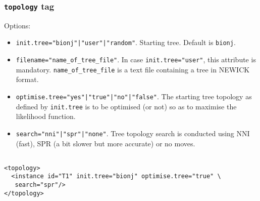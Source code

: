 \documentclass[a4paper,12pt]{article}
\newcommand{\x}[1]{\texttt{#1}}
\begin{document}
\subsubsection{{\tt topology} tag}
Options:
\begin{itemize}
\item \x{init.tree="bionj"|"user"|"random"}.  Starting tree. Default is \x{bionj}.
\item \x{filename="name\_of\_tree\_file"}. In case \x{init.tree="user"}, this
  attribute  is mandatory. \x{name\_of\_tree\_file} is a
  text file containing a tree in NEWICK format. 
\item \x{optimise.tree="yes"|"true"|"no"|"false"}. The starting tree topology as defined by
  \x{init.tree} is to be optimised (or not) so as to maximise the likelihood function.
\item \x{search="nni"|"spr"|"none"}. Tree topology search is conducted using NNI (fast), SPR (a bit
  slower but more accurate) or no moves.
\end{itemize}
\vspace{0.2cm}
\begin{Verbatim}[frame=single, label=Example of `topology' tag, samepage=true, baselinestretch=0.5]

<topology>
  <instance id="T1" init.tree="bionj" optimise.tree="true" \
   search="spr"/>
</topology>

\end{Verbatim}
\end{document}
